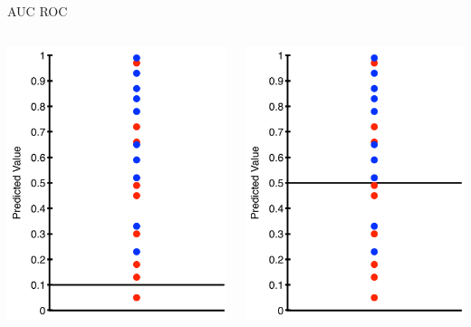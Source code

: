 \documentclass[aspectratio=169]{beamer}
\begin{document}
\begin{frame}{AUC ROC}
\begin{columns}
\begin{column}{0.2\textwidth}
    \includegraphics[width=1\textwidth]{lectSup/AUCEx2.pdf} 
\end{column}
\begin{column}{0.2\textwidth}
    \includegraphics[width=1\textwidth]{lectSup/AUCEx4.pdf} 

\end{column}
\end{columns}
\end{frame}
\end{document}

